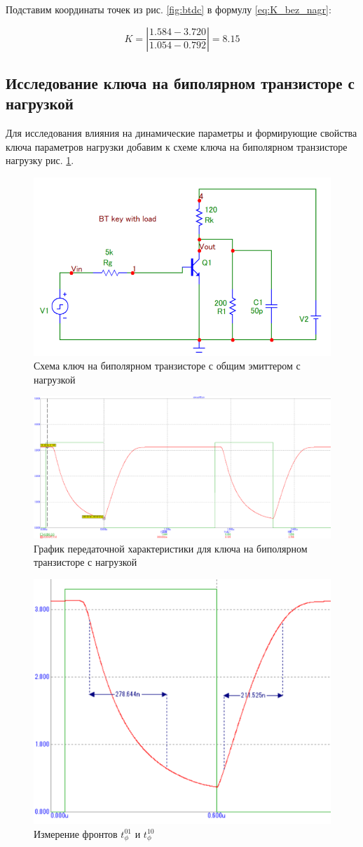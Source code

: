 \documentclass[a4paper,14pt]{article}
\begin{document}
Подставим координаты точек из рис. \ref{fig:btdc} в формулу \ref{eq:K_bez_nagr}:

\begin{equation}
K = \left|\dfrac{1.584 - 3.720}{1.054 - 0.792} \right| = 8.15
\label{eq:K_bez_nagr_p}
\end{equation}


\subsection{Исследование ключа на биполярном транзисторе с нагрузкой}

Для исследования влияния на динамические параметры и формирующие свойства ключа параметров нагрузки добавим к схеме ключа на биполярном транзисторе нагрузку рис. \ref{fig:btshnagr}.

\begin{figure}[H]
	\centering
	\includegraphics[width=0.7\linewidth]{image/BT_sh_nagr}
	\caption{Схема ключ на биполярном транзисторе с общим эмиттером с нагрузкой}
	\label{fig:btshnagr}
\end{figure}

\begin{figure}[H]
	\centering
	\includegraphics[width=0.7\linewidth]{image/BT_graf_nagr}
	\caption{График передаточной характеристики для ключа на биполярном транзисторе с нагрузкой}
	\label{fig:btgrafnagr}
\end{figure}

\begin{figure}[H]
	\centering
	\includegraphics[width=0.4\linewidth]{image/BT_graf_nagr_fr}
	\caption{Измерение фронтов $t^{01}_{\phi}$ и $t^{10}_{\phi}$}
	\label{fig:btgrafnagrfr}
\end{figure}
\end{document}
